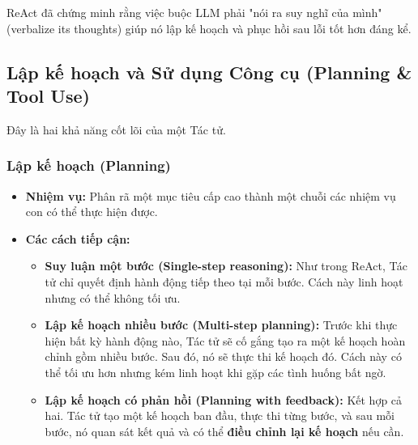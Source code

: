 ReAct đã chứng minh rằng việc buộc LLM phải "nói ra suy nghĩ của mình" (verbalize its thoughts) giúp nó lập kế hoạch và phục hồi sau lỗi tốt hơn đáng kể.

\subsection{Lập kế hoạch và Sử dụng Công cụ (Planning \& Tool Use)}
\label{ssec:planning_tool_use}
Đây là hai khả năng cốt lõi của một Tác tử.

\subsubsection{Lập kế hoạch (Planning)}
\begin{itemize}
    \item \textbf{Nhiệm vụ:} Phân rã một mục tiêu cấp cao thành một chuỗi các nhiệm vụ con có thể thực hiện được.
    \item \textbf{Các cách tiếp cận:}
        \begin{itemize}
            \item \textbf{Suy luận một bước (Single-step reasoning):} Như trong ReAct, Tác tử chỉ quyết định hành động tiếp theo tại mỗi bước. Cách này linh hoạt nhưng có thể không tối ưu.
            \item \textbf{Lập kế hoạch nhiều bước (Multi-step planning):} Trước khi thực hiện bất kỳ hành động nào, Tác tử sẽ cố gắng tạo ra một kế hoạch hoàn chỉnh gồm nhiều bước. Sau đó, nó sẽ thực thi kế hoạch đó. Cách này có thể tối ưu hơn nhưng kém linh hoạt khi gặp các tình huống bất ngờ.
            \item \textbf{Lập kế hoạch có phản hồi (Planning with feedback):} Kết hợp cả hai. Tác tử tạo một kế hoạch ban đầu, thực thi từng bước, và sau mỗi bước, nó quan sát kết quả và có thể \textbf{điều chỉnh lại kế hoạch} nếu cần.
        \end{itemize}
\end{itemize}

